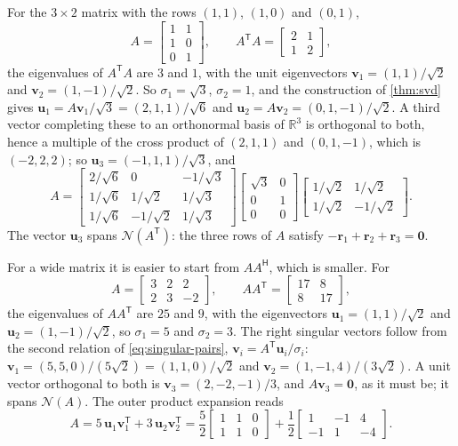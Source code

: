 For the $3\times2$ matrix with the rows $(1,1)$, $(1,0)$ and $(0,1)$,
\[
A=\begin{bmatrix}1&1\\1&0\\0&1\end{bmatrix},\qquad A^{\mathsf T}A=\begin{bmatrix}2&1\\1&2\end{bmatrix},
\]
the eigenvalues of $A^{\mathsf T}A$ are $3$ and $1$, with the unit eigenvectors $\mathbf v_1=(1,1)/\sqrt2$ and $\mathbf v_2=(1,-1)/\sqrt2$. So $\sigma_1=\sqrt3$, $\sigma_2=1$, and the construction of \cref{thm:svd} gives $\mathbf u_1=A\mathbf v_1/\sqrt3=(2,1,1)/\sqrt6$ and $\mathbf u_2=A\mathbf v_2=(0,1,-1)/\sqrt2$. A third vector completing these to an orthonormal basis of $\mathbb R^3$ is orthogonal to both, hence a multiple of the cross product of $(2,1,1)$ and $(0,1,-1)$, which is $(-2,2,2)$; so $\mathbf u_3=(-1,1,1)/\sqrt3$, and
\[
A=\begin{bmatrix}2/\sqrt6&0&-1/\sqrt3\\1/\sqrt6&1/\sqrt2&1/\sqrt3\\1/\sqrt6&-1/\sqrt2&1/\sqrt3\end{bmatrix}\begin{bmatrix}\sqrt3&0\\0&1\\0&0\end{bmatrix}\begin{bmatrix}1/\sqrt2&1/\sqrt2\\1/\sqrt2&-1/\sqrt2\end{bmatrix}.
\]
The vector $\mathbf u_3$ spans $\mathcal N(A^{\mathsf T})$: the three rows of $A$ satisfy $-\mathbf r_1+\mathbf r_2+\mathbf r_3=\mathbf 0$.

For a wide matrix it is easier to start from $AA^{\mathsf H}$, which is smaller. For
\[
A=\begin{bmatrix}3&2&2\\2&3&-2\end{bmatrix},\qquad AA^{\mathsf T}=\begin{bmatrix}17&8\\8&17\end{bmatrix},
\]
the eigenvalues of $AA^{\mathsf T}$ are $25$ and $9$, with the eigenvectors $\mathbf u_1=(1,1)/\sqrt2$ and $\mathbf u_2=(1,-1)/\sqrt2$, so $\sigma_1=5$ and $\sigma_2=3$. The right singular vectors follow from the second relation of \eqref{eq:singular-pairs}, $\mathbf v_i=A^{\mathsf T}\mathbf u_i/\sigma_i$: $\mathbf v_1=(5,5,0)/(5\sqrt2)=(1,1,0)/\sqrt2$ and $\mathbf v_2=(1,-1,4)/(3\sqrt2)$. A unit vector orthogonal to both is $\mathbf v_3=(2,-2,-1)/3$, and $A\mathbf v_3=\mathbf 0$, as it must be; it spans $\mathcal N(A)$. The outer product expansion reads
\[
A=5\,\mathbf u_1\mathbf v_1^{\mathsf T}+3\,\mathbf u_2\mathbf v_2^{\mathsf T}=\frac52\begin{bmatrix}1&1&0\\1&1&0\end{bmatrix}+\frac12\begin{bmatrix}1&-1&4\\-1&1&-4\end{bmatrix}.
\]

